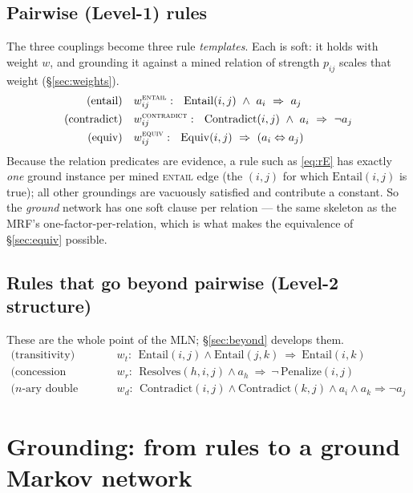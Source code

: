 \documentclass[11pt]{article}
\newcommand{\Ent}{\textsc{entail}}
\newcommand{\Con}{\textsc{contradict}}
\newcommand{\Equ}{\textsc{equiv}}
\begin{document}
\subsection{Pairwise (Level-1) rules}
The three couplings become three rule \emph{templates}. Each is soft: it holds with weight
$w$, and grounding it against a mined relation of strength $p_{ij}$ scales that weight
(\S\ref{sec:weights}).
\begin{align}
\text{(entail)}\quad   & w^{\Ent}_{ij}:\ \ \mathrm{Entail}(i,j)\ \wedge\ a_i \ \Rightarrow\ a_j
                          \label{eq:rE}\\
\text{(contradict)}\quad& w^{\Con}_{ij}:\ \ \mathrm{Contradict}(i,j)\ \wedge\ a_i \ \Rightarrow\ \neg a_j
                          \label{eq:rC}\\
\text{(equiv)}\quad    & w^{\Equ}_{ij}:\ \ \mathrm{Equiv}(i,j)\ \Rightarrow\ (a_i \Leftrightarrow a_j)
                          \label{eq:rQ}
\end{align}
Because the relation predicates are evidence, a rule such as \eqref{eq:rE} has exactly
\emph{one} ground instance per mined \Ent{} edge (the $(i,j)$ for which
$\mathrm{Entail}(i,j)$ is true); all other groundings are vacuously satisfied and contribute
a constant. So the \emph{ground} network has one soft clause per relation --- the same
skeleton as the MRF's one-factor-per-relation, which is what makes the equivalence of
\S\ref{sec:equiv} possible.

\subsection{Rules that go beyond pairwise (Level-2 structure)}
\label{sec:beyond-preview}
These are the whole point of the MLN; \S\ref{sec:beyond} develops them.
\begin{align}
\text{(transitivity)}\quad & w_t:\ \ \mathrm{Entail}(i,j)\wedge \mathrm{Entail}(j,k)\ \Rightarrow\ \mathrm{Entail}(i,k)
   \label{eq:rT}\\
\text{(concession cancels)}\quad & w_r:\ \ \mathrm{Resolves}(h,i,j)\wedge a_h\ \Rightarrow\ \neg\,\mathrm{Penalize}(i,j)
   \label{eq:rR}\\
\text{($n$-ary double conflict)}\quad & w_d:\ \ \mathrm{Contradict}(i,j)\wedge \mathrm{Contradict}(k,j)\wedge a_i\wedge a_k \Rightarrow \neg a_j
   \label{eq:rD}
\end{align}

\section{Grounding: from rules to a ground Markov network}
\label{sec:ground}
\end{document}
